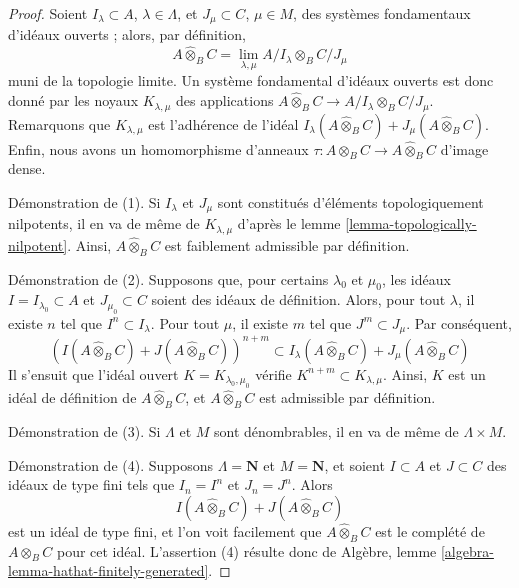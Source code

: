 \begin{proof}
Soient $I_\lambda \subset A$, $\lambda \in \Lambda$, et
$J_\mu \subset C$, $\mu \in M$,
des systèmes fondamentaux d'idéaux ouverts ; alors, par définition,
$$
A \widehat{\otimes}_B C =
\lim_{\lambda, \mu} A/I_\lambda \otimes_B C/J_\mu
$$
muni de la topologie limite. Un système fondamental d'idéaux ouverts
est donc donné par les noyaux $K_{\lambda, \mu}$ des applications
$A \widehat{\otimes}_B C \to A/I_\lambda \otimes_B C/J_\mu$.
Remarquons que $K_{\lambda, \mu}$ est l'adhérence de l'idéal
$I_\lambda(A \widehat{\otimes}_B C) + J_\mu(A \widehat{\otimes}_B C)$.
Enfin, nous avons un homomorphisme d'anneaux
$\tau : A \otimes_B C \to A \widehat{\otimes}_B C$ d'image dense.

\medskip\noindent
Démonstration de (1). Si $I_\lambda$ et $J_\mu$ sont constitués d'éléments topologiquement
nilpotents, il en va de même de $K_{\lambda, \mu}$ d'après
le lemme \ref{lemma-topologically-nilpotent}. Ainsi, 
$A \widehat{\otimes}_B C$ est faiblement admissible par définition.

\medskip\noindent
Démonstration de (2). Supposons que, pour certains $\lambda_0$ et $\mu_0$, les idéaux
$I = I_{\lambda_0} \subset A$ et $J_{\mu_0} \subset C$ soient des idéaux de
définition. Alors, pour tout $\lambda$, il existe $n$ tel que
$I^n \subset I_\lambda$. Pour tout $\mu$, il existe $m$ tel que
$J^m \subset J_\mu$. Par conséquent,
$$
\left(I(A \widehat{\otimes}_B C) + J(A \widehat{\otimes}_B C)\right)^{n + m}
\subset
I_\lambda(A \widehat{\otimes}_B C) + J_\mu(A \widehat{\otimes}_B C)
$$
Il s'ensuit que l'idéal ouvert $K = K_{\lambda_0, \mu_0}$
vérifie $K^{n + m} \subset K_{\lambda, \mu}$. Ainsi, $K$
est un idéal de définition de $A \widehat{\otimes}_B C$,
et $A \widehat{\otimes}_B C$ est admissible par définition.

\medskip\noindent
Démonstration de (3). Si $\Lambda$ et $M$ sont dénombrables, il en va de même de
$\Lambda \times M$.

\medskip\noindent
Démonstration de (4). Supposons $\Lambda = \mathbf{N}$ et $M = \mathbf{N}$,
et soient $I \subset A$ et $J \subset C$ des idéaux de type fini
tels que $I_n = I^n$ et $J_n = J^n$. Alors
$$
I(A \widehat{\otimes}_B C) + J(A \widehat{\otimes}_B C)
$$
est un idéal de type fini, et l'on voit facilement que
$A \widehat{\otimes}_B C$ est le complété de
$A \otimes_B C$ pour cet idéal. L'assertion (4)
résulte donc de Algèbre, lemme \ref{algebra-lemma-hathat-finitely-generated}.


\end{proof}
